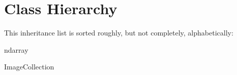 \section{Class Hierarchy}
This inheritance list is sorted roughly, but not completely, alphabetically\+:\begin{DoxyCompactList}
\item {}
\item ndarray\begin{DoxyCompactList}
\item {}
\end{DoxyCompactList}
\item Image\+Collection\begin{DoxyCompactList}
\item {}
\end{DoxyCompactList}
\end{DoxyCompactList}
